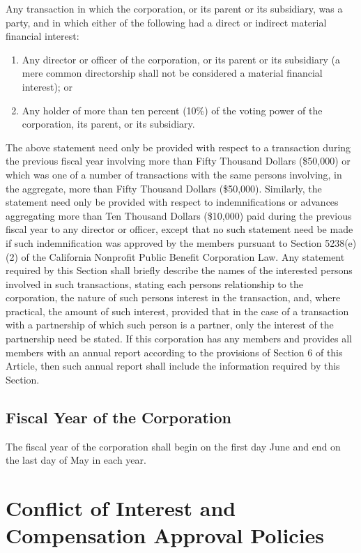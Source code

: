 \documentclass{article}
\begin{document}
	Any transaction in which the corporation, or its parent or its subsidiary, was a party, and in which either of the following had a direct or indirect material financial interest:
	\begin{enumerate}[\indent (a)]
		\item Any director or officer of the corporation, or its parent or its subsidiary (a mere common directorship shall not be considered a material financial interest); or
		\item Any holder of more than ten percent (10\%) of the voting power of the corporation, its parent, or its subsidiary.
	\end{enumerate}
	The above statement need only be provided with respect to a transaction during the previous fiscal year involving more than Fifty Thousand Dollars (\$50,000) or which was one of a number of transactions with the same persons involving, in the aggregate, more than Fifty Thousand Dollars (\$50,000).
	Similarly, the statement need only be provided with respect to indemnifications or advances aggregating more than Ten Thousand Dollars (\$10,000) paid during the previous fiscal year to any director or officer, except that no such statement need be made if such indemnification was approved by the members pursuant to Section 5238(e)(2) of the California Nonprofit Public Benefit Corporation Law.
	Any statement required by this Section shall briefly describe the names of the interested persons involved in such transactions, stating each person\textquotesingle s relationship to the corporation, the nature of such person\textquotesingle s interest in the transaction, and, where practical, the amount of such interest, provided that in the case of a transaction with a partnership of which such person is a partner, only the interest of the partnership need be stated.
	If this corporation has any members and provides all members with an annual report according to the provisions of Section 6 of this Article, then such annual report shall include the information required by this Section.
	\subsection{Fiscal Year of the Corporation}
	The fiscal year of the corporation shall begin on the first day June and end on the last day of May in each year.
	
	\section{Conflict of Interest and Compensation Approval Policies}
\end{document}

